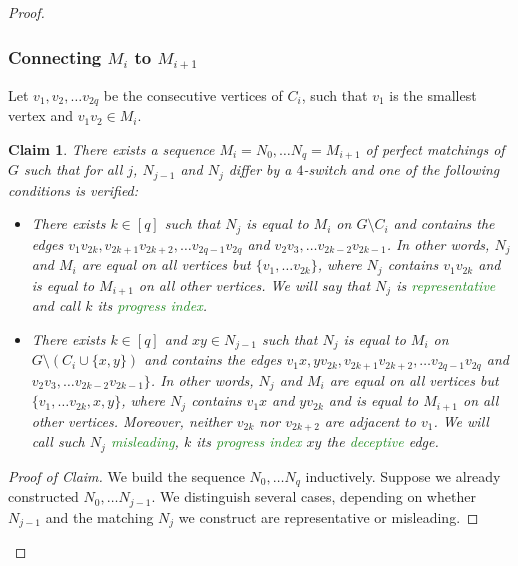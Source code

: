 \documentclass[11pt,a4paper]{article}
\newtheorem{claim}[theorem]{Claim}
\theoremstyle{definition}
\newenvironment{poc}{\begin{proof}[Proof of
    Claim]\renewcommand*{\qedsymbol}{$\blacksquare$}}{\end{proof}}
\newcommand{\defin}[1]{\emph{\textcolor{ForestGreen}{#1}}}
\begin{document}
\begin{proof}
  \subsubsection*{Connecting $M_i$ to $M_{i+1}$}
  Let $v_1, v_2, \dots v_{2q}$ be the consecutive vertices of $C_i$, such that
  $v_1$ is the smallest vertex and $v_1v_2 \in M_i$.
  \begin{claim}\label{cl:connecting_Mi}
    There exists a sequence $M_i= N_0, \dots N_q= M_{i+1}$ of
    perfect matchings of $G$ such that for all $j$, $N_{j-1}$ and $N_j$ differ
    by a $4$-switch and one of the following conditions is verified:
    \begin{itemize}
    \item There exists $k \in [q]$ such that $N_j$ is equal to $M_i$ on
      $G \setminus C_i$ and contains the edges
      $v_1v_{2k}, v_{2k+1}v_{2k+2}, \dots v_{2q-1}v_{2q}$ and
      $v_2v_3, \dots v_{2k-2}v_{2k-1}$. In other words, $N_j$ and $M_i$ are
      equal on all vertices but $\{v_1, \dots v_{2k}\}$, where $N_j$ contains
      $v_1v_{2k}$ and is equal to $M_{i+1}$ on all other vertices. We will say
      that $N_j$ is \defin{representative} and call $k$ its \defin{progress index}.
    \item There exists $k \in [q]$ and $xy \in N_{j-1}$ such that $N_j$ is equal
      to $M_i$ on $G \setminus (C_i \cup \{x,y\})$ and contains the edges
      $v_1x, yv_{2k}, v_{2k+1}v_{2k+2}, \dots v_{2q-1}v_{2q}$ and
      $v_2v_3, \dots v_{2k-2}v_{2k-1}\}$. In other words, $N_j$ and $M_i$ are
      equal on all vertices but $\{v_1, \dots v_{2k}, x, y\}$, where $N_j$
      contains $v_1x$ and $yv_{2k}$ and is equal to $M_{i+1}$ on all other
      vertices. Moreover, neither $v_{2k}$ nor $v_{2k+2}$ are adjacent to
      $v_1$. We will call such $N_j$ \defin{misleading}, $k$ its \defin{progress
        index} $xy$ the \defin{deceptive} edge.
    \end{itemize}
  \end{claim}
  \begin{poc}
    We build the sequence $N_0, \dots N_q$ inductively. Suppose we already
    constructed $N_0, \dots N_{j-1}$. We distinguish several cases, depending on
    whether $N_{j-1}$ and the matching $N_j$ we construct are representative or
    misleading.


\end{poc}
\end{proof}
\end{document}
